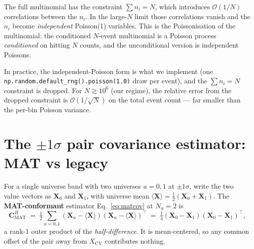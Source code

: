\documentclass[12pt]{article}
\newcommand{\CV}{\text{CV}}
\newcommand{\T}{^{\!\top}}
\begin{document}
The full multinomial has the constraint $\sum n_{i}=N$, which
introduces $\mathcal{O}(1/N)$ correlations between the $n_{i}$. In the
large-$N$ limit those correlations vanish and the $n_{i}$ become
\emph{independent} Poisson(1) variables. This is the Poissonisation
of the multinomial: the conditioned $N$-event multinomial is a
Poisson process \emph{conditioned} on hitting $N$ counts, and the
unconditional version is independent Poissons.

In practice, the independent-Poisson form is what we implement (one
\texttt{np.random.default\_rng().poisson(1.0)} draw per event), and
the $\sum n_{i}=N$ constraint is dropped. For $N \gtrsim 10^{6}$
(our regime), the relative error from the dropped constraint is
$\mathcal{O}(1/\sqrt{N})$ on the total event count --- far smaller
than the per-bin Poisson variance.

\section{The $\pm 1\sigma$ pair covariance estimator: MAT vs legacy}
\label{app:pair}

For a single universe band with two universes $u=0,1$ at $\pm 1\sigma$,
write the two value vectors as $\mathbf{X}_{0}$ and $\mathbf{X}_{1}$,
with universe mean $\langle\mathbf{X}\rangle = \tfrac12(\mathbf{X}_{0}
+\mathbf{X}_{1})$. The \textbf{MAT-conformant} estimator
Eq.~\eqref{eq:matcov} at $N_{u}=2$ is
\begin{equation}
\mathbf{C}^{B}_{\text{MAT}}
\;=\;
\tfrac12\sum_{u=0,1}(\mathbf{X}_{u}-\langle\mathbf{X}\rangle)(\mathbf{X}_{u}-\langle\mathbf{X}\rangle)\T
\;=\;
\tfrac14(\mathbf{X}_{0}-\mathbf{X}_{1})(\mathbf{X}_{0}-\mathbf{X}_{1})\T,
\end{equation}
a rank-1 outer product of the \emph{half-difference}. It is mean-centered,
so any common offset of the pair away from $X_{\CV}$ contributes
nothing.
\end{document}
